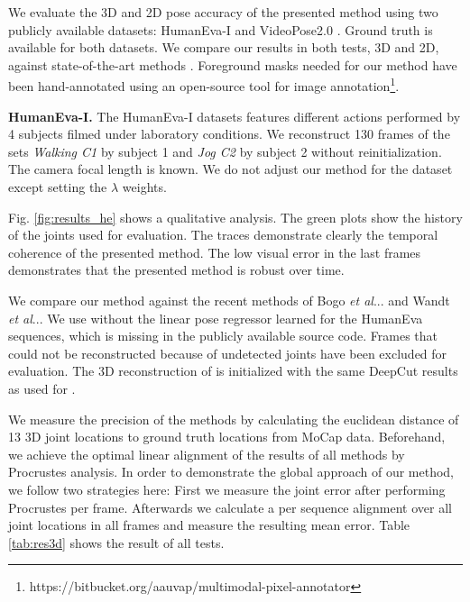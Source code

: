 \documentclass[10pt,twocolumn,letterpaper]{article}
\makeatletter
\DeclareRobustCommand\onedot{\futurelet\@let@token\@onedot}
\def\@onedot{\ifx\@let@token.\else.\null\fi\xspace}
\def\etal{\emph{et al}\onedot}
\makeatother
\begin{document}
We evaluate the 3D and 2D pose accuracy of the presented method using two publicly available datasets: HumanEva-I \cite{sigal2010humaneva} and VideoPose2.0 \cite{sapp2011parsing}. Ground truth is available for both datasets. We compare our results in both tests, 3D and 2D, against state-of-the-art methods \cite{bogo2016smplify,wandt20163d,deepcut16cvpr}. Foreground masks needed for our method have been hand-annotated using an open-source tool for image annotation\footnote {https://bitbucket.org/aauvap/multimodal-pixel-annotator}.

\textbf{HumanEva-I.} The HumanEva-I datasets features different actions performed by 4 subjects filmed under laboratory conditions. We reconstruct 130 frames of the sets \emph{Walking C1} by subject 1 and \emph{Jog C2} by subject 2 without reinitialization. The camera focal length is known. We do not adjust our method for the dataset except setting the $\lambda$ weights.

Fig. \ref{fig:results_he} shows a qualitative analysis. The green plots show the history of the joints used for evaluation. The traces demonstrate clearly the temporal coherence of the presented method. The low visual error in the last frames demonstrates  that the presented method is robust over time.

We compare our method against the recent methods of Bogo \etal. \cite{bogo2016smplify} and Wandt \etal \cite{wandt20163d}. We use \cite{bogo2016smplify} without the linear pose regressor learned for the HumanEva sequences, which is missing in the publicly available source code. Frames that could not be reconstructed because of undetected joints have been excluded for evaluation. The 3D reconstruction of \cite{wandt20163d} is initialized with the same DeepCut \cite{deepcut16cvpr} results as used for \cite{bogo2016smplify}. %

We measure the precision of the methods by calculating the euclidean distance of 13 3D joint locations to ground truth locations from MoCap data. Beforehand, we achieve the optimal linear alignment of the results of all methods by Procrustes analysis. In order to demonstrate the global approach of our method, we follow two strategies here: First we measure the joint error after performing Procrustes per frame. Afterwards we calculate a per sequence alignment over all joint locations in all frames and measure the resulting mean error. Table \ref{tab:res3d} shows the result of all tests.
\end{document}

